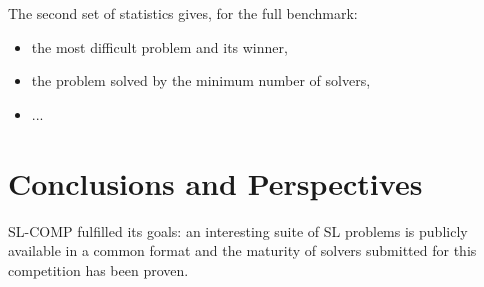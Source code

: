 \documentclass{llncs}
\begin{document}
The second set of statistics gives, for the full benchmark:
\begin{itemize}
\item the most difficult problem and its winner,
\item the problem solved by the minimum number of solvers,
\item ...
\end{itemize}



\section{Conclusions and Perspectives}

SL-COMP fulfilled its goals:
an interesting suite of SL problems is publicly available in a common format and
the maturity of solvers submitted for this competition has been proven.
\end{document}
